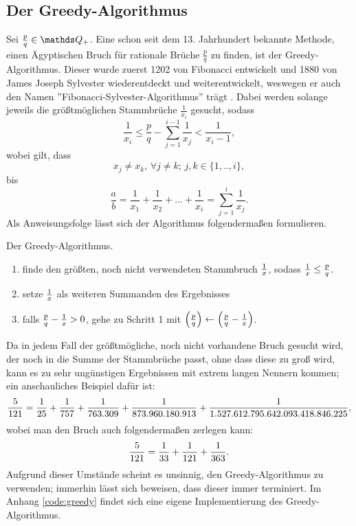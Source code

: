 \subsection{Der Greedy-Algorithmus}
Sei $\frac{p}{q} \in \Q_+$. Eine schon seit dem 13. Jahrhundert bekannte Methode, einen Ägyptischen Bruch für rationale Brüche $\frac{p}{q}$ zu finden, ist der Greedy-Algorithmus. Dieser wurde zuerst 1202 von Fibonacci entwickelt und 1880 von James Joseph Sylvester wiederentdeckt und weiterentwickelt, weswegen er auch den Namen ''Fibonacci-Sylvester-Algorithmus'' trägt \cite[S.44f]{Burton2011}. Dabei werden solange jeweils die größtmöglichen Stammbrüche $\frac{1}{x_i}$ gesucht, sodass
\begin{equation}\label{eq:greedy_fracNorm}
\frac{1}{x_i} \leq \frac{p}{q} - \sum_{j=1}^{i-1} \frac{1}{x_j} < \frac{1}{x_{i}-1},
\end{equation}
wobei gilt, dass
$$x_j \neq x_k,\, \forall j \neq k;\, j,k \in \{1,..,i\},$$ 
bis
$$\frac{a}{b} = \frac{1}{x_1} + \frac{1}{x_2} + ... + \frac{1}{x_i} = \sum_{j=1}^{i} \frac{1}{x_j}.$$
Als Anweisungsfolge lässt sich der Algorithmus folgendermaßen formulieren.
\begin{algorithm}\label{algo:greedy}
	Der Greedy-Algorithmus.
	\begin{enumerate}
		\item finde den größten, noch nicht verwendeten Stammbruch $\frac{1}{x}$, sodass $\frac{1}{x} \leq \frac{p}{q}$.
		\item setze $\frac{1}{x}$ als weiteren Summanden des Ergebnisses
		\item falls $\frac{p}{q} - \frac{1}{x} > 0$, gehe zu Schritt 1 mit $\left(\frac{p}{q}\right) \leftarrow \left(\frac{p}{q}-\frac{1}{x}\right)$.
	\end{enumerate}
\end{algorithm}

Da in jedem Fall der größtmögliche, noch nicht vorhandene Bruch gesucht wird, der noch in die Summe der Stammbrüche passt, ohne dass diese zu groß wird, kann es zu sehr ungünstigen Ergebnissen mit extrem langen Nennern kommen; ein anschauliches Beispiel dafür ist:
$$\frac{5}{121} = \frac{1}{25} + \frac{1}{757} + \frac{1}{763.309} + \frac{1}{873.960.180.913} + \frac{1}{1.527.612.795.642.093.418.846.225},$$
wobei man den Bruch auch folgendermaßen zerlegen kann:
$$\frac{5}{121} = \frac{1}{33} + \frac{1}{121} + \frac{1}{363}.$$
Aufgrund dieser Umstände scheint es unsinnig, den Greedy-Algorithmus zu verwenden; immerhin lässt sich beweisen, dass dieser immer terminiert.
Im Anhang \ref{code:greedy} findet sich eine eigene Implementierung des Greedy-Algorithmus.

